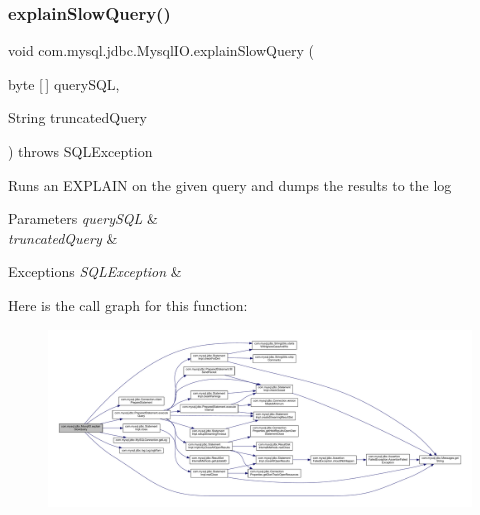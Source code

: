 \subsubsection{\texorpdfstring{explain\+Slow\+Query()}{explainSlowQuery()}}
{\footnotesize\ttfamily void com.\+mysql.\+jdbc.\+Mysql\+I\+O.\+explain\+Slow\+Query (\begin{DoxyParamCaption}\item[{byte \mbox{[}$\,$\mbox{]}}]{query\+S\+QL,  }\item[{String}]{truncated\+Query }\end{DoxyParamCaption}) throws S\+Q\+L\+Exception\hspace{0.3cm}{\ttfamily [protected]}}

Runs an \textquotesingle{}E\+X\+P\+L\+A\+IN\textquotesingle{} on the given query and dumps the results to the log


\begin{DoxyParams}{Parameters}
{\em query\+S\+QL} & \\
\hline
{\em truncated\+Query} & \\
\hline
\end{DoxyParams}

\begin{DoxyExceptions}{Exceptions}
{\em S\+Q\+L\+Exception} & \\
\hline
\end{DoxyExceptions}
Here is the call graph for this function\+:
\nopagebreak
\begin{figure}[H]
\begin{center}
\leavevmode
\includegraphics[width=350pt]{classcom_1_1mysql_1_1jdbc_1_1_mysql_i_o_a86ec9e7284f797edec7e5ec4880f2006_cgraph}
\end{center}
\end{figure}
\mbox{\label{classcom_1_1mysql_1_1jdbc_1_1_mysql_i_o_a35b3e85f82755ba047023c6094ab5cd6}} 
